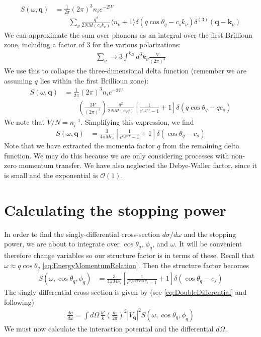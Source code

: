 \documentclass{article}
\newcommand{\OO}{\mathcal{O}}
\begin{document}
\begin{align}
S(\omega, \textbf{q}) &= \frac{1}{2 \pi} (2 \pi)^3 n_i e^{-2 W}  \nonumber\\
&\qquad \sum_\nu\frac{q^2}{2 NM (c_sk_\nu)} \langle n_\nu + 1 \rangle \delta(q \cos\theta_{q} - c_sk_\nu) \delta^{(3)}(\textbf{q} - \textbf{k}_\nu)
\end{align}
We can approximate the sum over phonons as an integral over the first Brillioun zone, including a factor of 3 for the various polarizations:
\begin{align}
\sum_\nu \to 3 \int^{k_D} d^3 k_\nu\frac{V}{(2 \pi)^3}  %
\end{align}
We use this to collapse the three-dimensional delta function (remember we are assuming $q$ lies within the first Brillioun zone):
\begin{align}
S(\omega, \textbf{q}) &= \frac{1}{2 \pi} (2 \pi)^3 n_i e^{-2 W}  \nonumber\\
&\qquad \left( \frac{3V}{(2 \pi)^3} \right)\frac{q^2}{2 NM (c_sq)} \left[ \frac{1}{e^{c_sq / T} - 1} + 1 \right] \delta(q\cos\theta_{q} - qc_s)
\end{align}
We note that $V / N = n_i^{-1}$. Simplifying this expression, we find
\begin{align}
S(\omega, \textbf{q}) &= \frac{3}{4 \pi M c_s} \left[ \frac{1}{e^{c_sq / T} - 1} +1 \right] \delta(\cos\theta_{q} - c_s)
\label{eq:FirstBrilliounZoneStructureFactor}
\end{align}
Note that we have extracted the momenta factor $q$ from the remaining delta function. We may do this because we are only considering processes with non-zero momentum transfer. We have also neglected the Debye-Waller factor, since it is small and the exponential is $\OO(1)$.

\section{Calculating the stopping power}

In order to find the singly-differential cross-section $d \sigma / d \omega$ and the stopping power, we are about to integrate over $\cos\theta_q$, $\phi_q$, and $\omega$. It will be convenient therefore change variables so our structure factor is in terms of these. Recall that $\omega \approx q \cos\theta_q$ \eqref{eq:EnergyMomentumRelation}. Then the structure factor becomes
\begin{align}
\label{eq:StructureFactorVariableChange}
S(\omega, \cos\theta_q, \phi_q) &= \frac{3}{4 \pi M c_s} \left[ \frac{1}{e^{c_s\omega / T\cos\theta_q} - 1} + 1 \right] \delta(\cos\theta_{q} - c_s)
\end{align}
The singly-differential cross-section is given by (see \eqref{eq:DoubleDifferential} and following)
\begin{align}
\frac{d \sigma}{d \omega} = \int d \Omega\, \frac{k'}{k}\left( \frac{m}{2 \pi} \right)^2 |V_\textbf{q}|^2 S(\omega, \cos\theta_q, \phi_q)
\label{eq:SinglyDifferential}
\end{align}
We must now calculate the interaction potential and the differential $d \Omega$.
\end{document}
